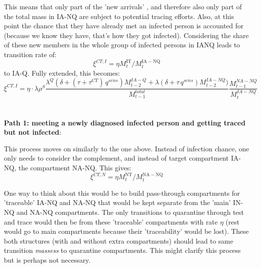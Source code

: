 \documentclass{article}
\begin{document}
This means that only part of the 'new arrivals' , and therefore also only part of the total mass in IA-NQ are subject to potential tracing efforts. Also, at this point the chance that they have already met an infected person is accounted for (because we know they have, that's how they got infected). Considering the share of these new members in the whole group of infected persons in IANQ leads to transition rate of:
\begin{equation}
\xi^{CT, I} = \eta   M^\mathrm{IT}_t  / M^\mathrm{IA-NQ}_t
\end{equation}
to IA-Q. 
Fully extended, this becomes:
\begin{equation}
\xi^{CT, I} = \eta \cdot \lambda \rho^S   \frac{\lambda^{Q} (\delta  + (\tau + \tau^{CT}) \,q^{sens}) M^{IA-Q}_{t-2} + \lambda(\delta  + \tau \,q^{sens} ) M^{IA-NQ}_{t-2}) }{M_{t-1}^{total}} \frac{M_{t-1}^{NA-NQ}}{M^{IA-NQ}_t} 
\end{equation}
\\
\\
\textbf{Path 1: meeting a newly diagnosed infected person and getting traced but not infected}:

This process moves on similarly to the one above. Instead of infection chance, one only needs to consider the complement, and instead of target compartment IA-NQ, the compartment NA-NQ. This gives:
\begin{equation}
	\xi^{CT, N} = \eta  M^\mathrm{NT}_t / M^\mathrm{NA-NQ}_t
\end{equation}

One way to think about this would be to build pass-through compartments for 'traceable' IA-NQ and NA-NQ that would be kept separate from the 'main' IN-NQ and NA-NQ compartments. The only transitions to quarantine through test and trace would then be from these 'traceable' compartments with rate $\eta$ (rest would go to main compartments because their 'traceability' would be lost). These both structures (with and without extra compartments) should lead to same transition \emph{massess} to quarantine compartments. This might clarify this process but is perhaps not necessary.
\end{document}

